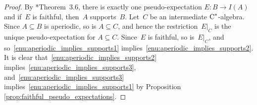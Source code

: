 \documentclass[a4paper]{amsart}
\theoremstyle{plain}
\theoremstyle{definition}
\theoremstyle{remark}
\numberwithin{theorem}{section}
\numberwithin{equation}{section}
\newcommand*{\nb}{\nobreakdash}
\newcommand*{\Cst}{\textup C^*}%
\begin{document}
\begin{proof}
  By
  \cite{Kwasniewski-Meyer:Aperiodicity_pseudo_expectations}*{Theorem~3.6},
  there is exactly one pseudo-expectation \(E\colon B\to I(A)\) and
  if~\(E\) is faithful, then~\(A\) supports~\(B\).
  Let~\(C\) be an intermediate \(\Cst\)\nb-algebra.
  Since \(A\subseteq B\) is aperiodic, so is \(A\subseteq C\), and hence
  the restriction~\(E|_C\) is the unique pseudo-expectation for
  \(A\subseteq C\).
  Since~\(E\) is faithful, so is~\(E|_C\), and
  so~\ref{enu:aperiodic_implies_supports1}
  implies~\ref{enu:aperiodic_implies_supports2}.
  It is clear that~\ref{enu:aperiodic_implies_supports2}
  implies~\ref{enu:aperiodic_implies_supports3},
  and~\ref{enu:aperiodic_implies_supports3}
  implies~\ref{enu:aperiodic_implies_supports1} by Proposition
  \ref{prop:faithful_pseudo_expectations}.
\end{proof}
\end{document}
